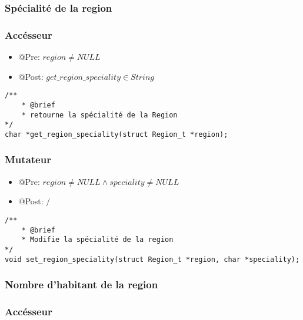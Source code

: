 \subsubsection{Spécialité de la region}

\subsubsection{Accésseur}

\begin{itemize}
    \item @Pre: $region \ne NULL$
    \item @Post: $get\_region\_speciality \in String$ 
\end{itemize}

\begin{lstlisting}
/**
    * @brief 
    * retourne la spécialité de la Region
*/
char *get_region_speciality(struct Region_t *region);
\end{lstlisting}

\subsubsection{Mutateur}

\begin{itemize}
    \item @Pre: $region \ne NULL \land speciality \ne NULL$
    \item @Post: $\slash$
\end{itemize}

\begin{lstlisting}
/**
    * @brief 
    * Modifie la spécialité de la region
*/
void set_region_speciality(struct Region_t *region, char *speciality);
\end{lstlisting} 


\subsubsection{Nombre d'habitant de la region}

\subsubsection{Accésseur}

